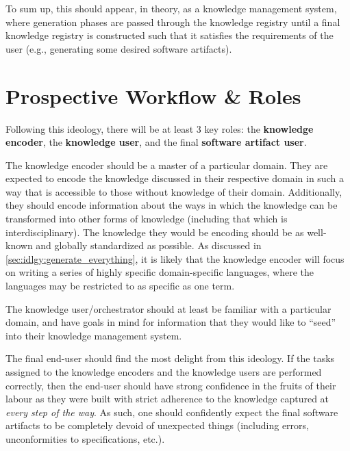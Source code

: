To sum up, this should appear, in theory, as a knowledge management
system, where generation phases are passed through the knowledge
registry until a final knowledge registry is constructed such that it satisfies
the requirements of the user (e.g., generating some desired software artifacts).

\section{Prospective Workflow \& Roles}
\label{sec:idlgy:prospective_workflow}

Following this ideology, there will be at least 3 key roles: the
\textbf{knowledge encoder}, the \textbf{knowledge user}, and the final
\textbf{software artifact user}. 

The knowledge encoder should be a master of a particular domain. They are
expected to encode the knowledge discussed in their respective domain in such a
way that is accessible to those without knowledge of their domain. Additionally,
they should encode information about the ways in which the knowledge can be
transformed into other forms of knowledge (including that which is
interdisciplinary). The knowledge they would be encoding should be as well-known
and globally standardized as possible. As discussed in
\autoref{sec:idlgy:generate_everything}, it is likely that the knowledge encoder
will focus on writing a series of highly specific domain-specific languages,
where the languages may be restricted to as specific as one term.

The knowledge user/orchestrator should at least be familiar with a particular
domain, and have goals in mind for information that they would like to ``seed''
into their knowledge management system. 

The final end-user should find the most delight from this ideology. If the tasks
assigned to the knowledge encoders and the knowledge users are performed
correctly, then the end-user should have strong confidence in the fruits of
their labour as they were built with strict adherence to the knowledge captured
at \textit{every step of the way}. As such, one should confidently expect the
final software artifacts to be completely devoid of unexpected things (including
errors, unconformities to specifications, etc.).

